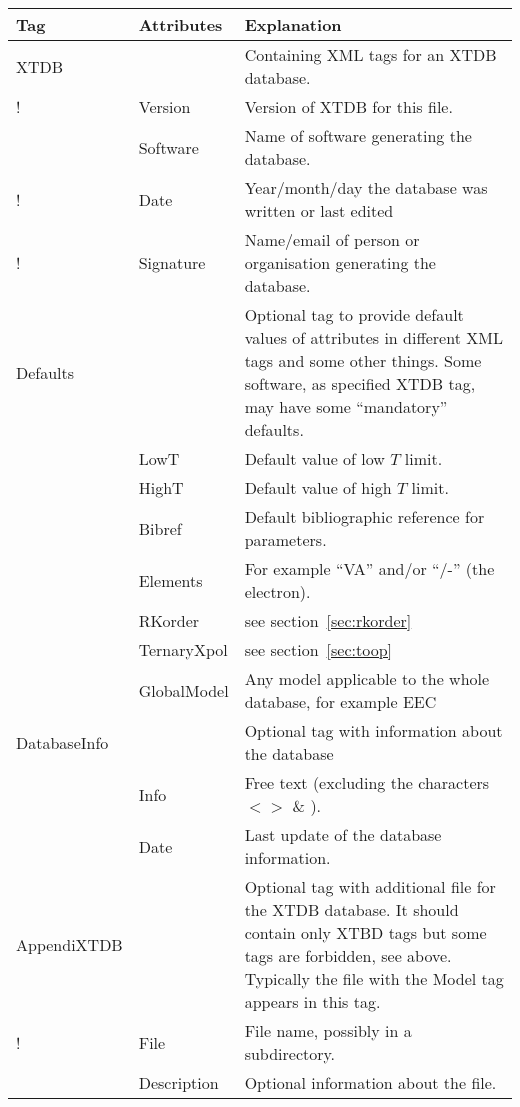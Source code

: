 \documentclass{article}
\begin{document}
\begin{tabular}{|p{} p{} p{}|}\hline
  Tag & Attributes & Explanation\\\hline

  XTDB    &         & Containing XML tags for an XTDB database.\\
!          & Version & Version of XTDB for this file.\\
           &Software & Name of software generating the database.\\
!          &Date     & Year/month/day the database was written or last edited\\
!          &Signature & Name/email of person or organisation generating the database.\\\hline
  
  Defaults & & Optional tag to provide default values of attributes in
  different XML tags and some other things.  Some software, as
  specified XTDB tag,  may have some ``mandatory'' defaults.\\
           & LowT & Default value of low $T$ limit.\\
           & HighT & Default value of high $T$ limit.\\
           & Bibref & Default bibliographic reference for parameters. \\
           & Elements & For example ``VA'' and/or ``/-'' (the electron).\\
           & RKorder & see section~\ref{sec:rkorder} \\
           & TernaryXpol & see section~\ref{sec:toop} \\
           & GlobalModel & Any model applicable to the whole database,
                 for example EEC~\cite{21Sun}\\\hline

  DatabaseInfo & & Optional tag with information about the database\\
           & Info & Free text (excluding the characters $< >$ \& ).\\
           & Date & Last update of the database information.\\\hline

  AppendiXTDB & & Optional tag with additional file for the XTDB database.  
              It should contain only XTBD tags but some tags are forbidden,
              see above.  Typically the file with the Model tag appears
              in this tag.\\
!              & File & File name, possibly in a subdirectory.\\
              & Description & Optional information about the file.\\\hline
\end{tabular}
\end{document}
